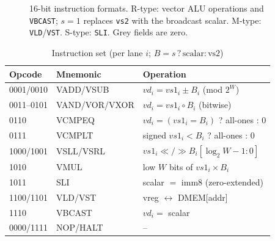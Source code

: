 \documentclass[conference]{IEEEtran}
\begin{document}
\begin{figure}[t]
\centering
{}
\caption{16-bit instruction formats. R-type: vector ALU operations and
\texttt{VBCAST}; $s=1$ replaces \texttt{vs2} with the broadcast scalar.
M-type: \texttt{VLD}/\texttt{VST}. S-type: \texttt{SLI}. Grey fields are zero.}
\label{fig:fmt}
\end{figure}

\begin{table}[t]
\centering
\caption{Instruction set (per lane $i$; $B = s\,?\,\text{scalar} : \text{vs2}$)}
\label{tab:isa}
\footnotesize
\setlength{\tabcolsep}{4pt}
\begin{tabular}{@{}lll@{}}
\toprule
Opcode & Mnemonic & Operation \\
\midrule
0001/0010 & VADD/VSUB & $vd_i = vs1_i \pm B_i$ (mod $2^W$) \\
0011--0101 & VAND/VOR/VXOR & $vd_i = vs1_i \circ B_i$ (bitwise) \\
0110 & VCMPEQ & $vd_i = (vs1_i = B_i)$ ? all-ones : 0 \\
0111 & VCMPLT & signed $vs1_i < B_i$ ? all-ones : 0 \\
1000/1001 & VSLL/VSRL & $vs1_i \ll / \gg B_i[\log_2 W-1:0]$ \\
1010 & VMUL & low $W$ bits of $vs1_i \times B_i$ \\
1011 & SLI & scalar $=$ imm8 (zero-extended) \\
1100/1101 & VLD/VST & vreg $\leftrightarrow$ DMEM[addr] \\
1110 & VBCAST & $vd_i =$ scalar \\
0000/1111 & NOP/HALT & -- \\
\bottomrule
\end{tabular}
\end{table}
\end{document}
